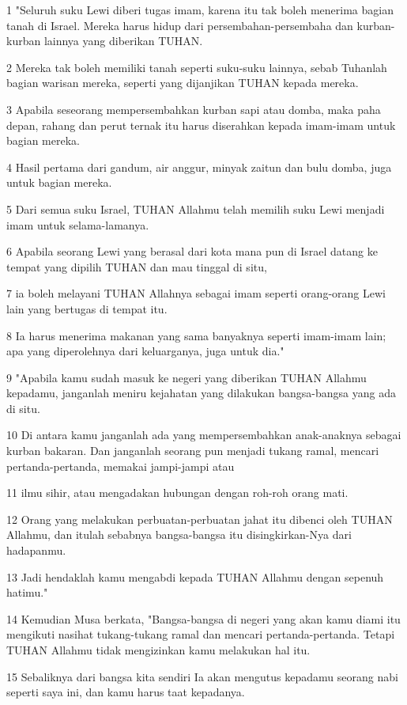 \par 1 "Seluruh suku Lewi diberi tugas imam, karena itu tak boleh menerima bagian tanah di Israel. Mereka harus hidup dari persembahan-persembaha dan kurban-kurban lainnya yang diberikan TUHAN.
\par 2 Mereka tak boleh memiliki tanah seperti suku-suku lainnya, sebab Tuhanlah bagian warisan mereka, seperti yang dijanjikan TUHAN kepada mereka.
\par 3 Apabila seseorang mempersembahkan kurban sapi atau domba, maka paha depan, rahang dan perut ternak itu harus diserahkan kepada imam-imam untuk bagian mereka.
\par 4 Hasil pertama dari gandum, air anggur, minyak zaitun dan bulu domba, juga untuk bagian mereka.
\par 5 Dari semua suku Israel, TUHAN Allahmu telah memilih suku Lewi menjadi imam untuk selama-lamanya.
\par 6 Apabila seorang Lewi yang berasal dari kota mana pun di Israel datang ke tempat yang dipilih TUHAN dan mau tinggal di situ,
\par 7 ia boleh melayani TUHAN Allahnya sebagai imam seperti orang-orang Lewi lain yang bertugas di tempat itu.
\par 8 Ia harus menerima makanan yang sama banyaknya seperti imam-imam lain; apa yang diperolehnya dari keluarganya, juga untuk dia."
\par 9 "Apabila kamu sudah masuk ke negeri yang diberikan TUHAN Allahmu kepadamu, janganlah meniru kejahatan yang dilakukan bangsa-bangsa yang ada di situ.
\par 10 Di antara kamu janganlah ada yang mempersembahkan anak-anaknya sebagai kurban bakaran. Dan janganlah seorang pun menjadi tukang ramal, mencari pertanda-pertanda, memakai jampi-jampi atau
\par 11 ilmu sihir, atau mengadakan hubungan dengan roh-roh orang mati.
\par 12 Orang yang melakukan perbuatan-perbuatan jahat itu dibenci oleh TUHAN Allahmu, dan itulah sebabnya bangsa-bangsa itu disingkirkan-Nya dari hadapanmu.
\par 13 Jadi hendaklah kamu mengabdi kepada TUHAN Allahmu dengan sepenuh hatimu."
\par 14 Kemudian Musa berkata, "Bangsa-bangsa di negeri yang akan kamu diami itu mengikuti nasihat tukang-tukang ramal dan mencari pertanda-pertanda. Tetapi TUHAN Allahmu tidak mengizinkan kamu melakukan hal itu.
\par 15 Sebaliknya dari bangsa kita sendiri Ia akan mengutus kepadamu seorang nabi seperti saya ini, dan kamu harus taat kepadanya.
